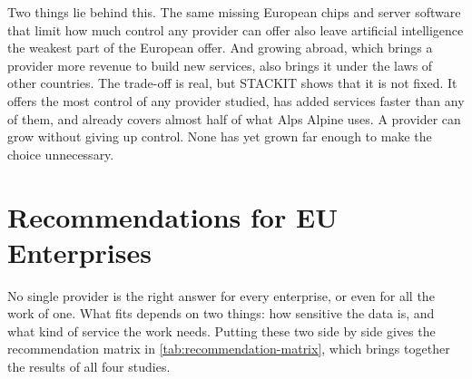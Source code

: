 Two things lie behind this. The same missing European chips and server software
that limit how much control any provider can offer also leave artificial
intelligence the weakest part of the European offer. And growing abroad, which
brings a provider more revenue to build new services, also brings it under the
laws of other countries. The trade-off is real, but STACKIT shows that it is not
fixed. It offers the most control of any provider studied, has added services
faster than any of them, and already covers almost half of what Alps Alpine uses.
A provider can grow without giving up control. None has yet grown far enough to
make the choice unnecessary.

\section{Recommendations for EU Enterprises}
\label{sec:recommendations}

No single provider is the right answer for every enterprise, or even for all the
work of one. What fits depends on two things: how sensitive the data is, and what
kind of service the work needs. Putting these two side by side gives the
recommendation matrix in \cref{tab:recommendation-matrix}, which brings together
the results of all four studies.

